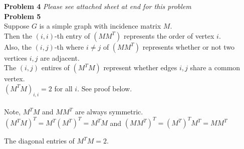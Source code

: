 \documentclass{article}
\newenvironment{claim}[2][Claim]{\begin{trivlist}
		\item[\hskip \labelsep {\bfseries #1}\hskip \labelsep {\bfseries #2}]}{\end{trivlist}}
\begin{document}
%
\newpage
\noindent\textbf{Problem 4}\textit{ Please see attached sheet at end for this problem}\\
\noindent\textbf{Problem 5}\\
Suppose $G$ is a simple graph with incidence matrix $M$. \\
Then the $(i,i)$-th entry of $(MM^T)$ represents the order of vertex $i$. \\ 
Also, the $(i,j)$-th where $i \neq j$ of $(MM^T)$ represents whether or not two vertices $i,j$ are adjacent. \\
The $(i,j)$ entires of $(M^TM)$ represent whether edges $i,j$ share a common vertex.\\
$(M^TM)_{i,i} = 2$ for all $i$. See proof below.\\ \\
Note, $M^TM$ and $MM^T$ are always symmetric.\\
$(M^TM)^T = M^T (M^T)^T = M^TM$ and $(MM^T)^T = (M^T)^T M^T = MM^T$

\begin{claim}{}
	The diagonal entries of $M^T M = 2$.
\end{claim}
\end{document}
